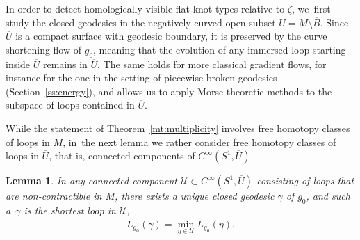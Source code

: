 \documentclass[JEP,XML,SOM,Unicode,NoFloatCountersInSection,published]{cedram}
\newcommand{\UU}{\mathcal{U}}
\theoremstyle{plain}
\newtheorem{Lemma}[Thm]{Lemma}
\theoremstyle{definition}
\begin{document}
In order to detect homologically visible flat knot types relative to $\zeta$, we~first study the closed geodesics in the negatively curved open subset $U=M\setminus\overline B$. Since $\overline U$ is a compact surface with geodesic boundary, it is preserved by the curve shortening flow of $g_0$, meaning that the evolution of any immersed loop starting inside $\overline U$ remains in $\overline U$. The same holds for more classical gradient flows, for instance for the one in the setting of piecewise broken geodesics (Section~\ref{ss:energy}), and allows us to apply Morse theoretic methods to the subspace of loops contained in $\overline U$.

While the statement of Theorem~\ref{mt:multiplicity} involves free homotopy classes of loops in $M$, in~the next lemma we rather consider free homotopy classes of loops in $\overline U$, that is, connected components of $C^\infty(S^1,\overline U)$.

\begin{Lemma}\label{l:unique_minimizer}
In any connected component $\UU\subset C^\infty(S^1,\overline U)$ consisting of loops that are non-contractible in $M$, there exists a unique closed geodesic $\gamma$ of $g_0$, and such a~$\gamma$ is the shortest loop in $\UU$, \ie
\begin{align*}
L_{g_0}(\gamma) = \min_{\eta\in\UU} L_{g_0}(\eta).
\end{align*}
\end{Lemma}
\end{document}
